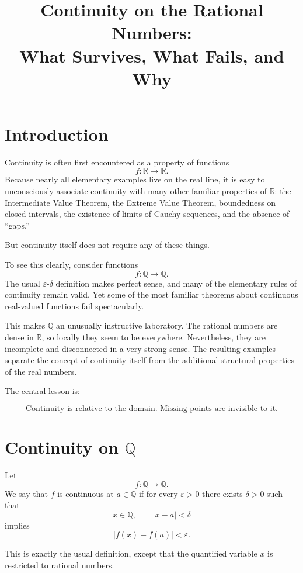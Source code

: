 \documentclass{essay}
\title{Continuity on the Rational Numbers:\\
What Survives, What Fails, and Why}
\author{}
\date{}
\begin{document}
\maketitle

\section{Introduction}

Continuity is often first encountered as a property of functions
\[
f:\mathbb{R}\to\mathbb{R}.
\]
Because nearly all elementary examples live on the real line, it is easy to
unconsciously associate continuity with many other familiar properties of
\(\mathbb{R}\): the Intermediate Value Theorem, the Extreme Value Theorem,
boundedness on closed intervals, the existence of limits of Cauchy sequences,
and the absence of ``gaps.''

But continuity itself does not require any of these things.

To see this clearly, consider functions
\[
f:\mathbb{Q}\to\mathbb{Q}.
\]
The usual \(\varepsilon\)-\(\delta\) definition makes perfect sense, and many of
the elementary rules of continuity remain valid. Yet some of the most familiar
theorems about continuous real-valued functions fail spectacularly.

This makes \(\mathbb{Q}\) an unusually instructive laboratory. The rational
numbers are dense in \(\mathbb{R}\), so locally they seem to be everywhere.
Nevertheless, they are incomplete and disconnected in a very strong sense.
The resulting examples separate the concept of continuity itself from the
additional structural properties of the real numbers.

The central lesson is:

\[
\boxed{\text{Continuity is relative to the domain. Missing points are invisible to it.}}
\]

\section{Continuity on \(\mathbb{Q}\)}

Let
\[
f:\mathbb{Q}\to\mathbb{Q}.
\]
We say that \(f\) is continuous at \(a\in\mathbb{Q}\) if for every
\(\varepsilon>0\) there exists \(\delta>0\) such that
\[
x\in\mathbb{Q},\qquad |x-a|<\delta
\]
implies
\[
|f(x)-f(a)|<\varepsilon.
\]

This is exactly the usual definition, except that the quantified variable
\(x\) is restricted to rational numbers.
\end{document}
